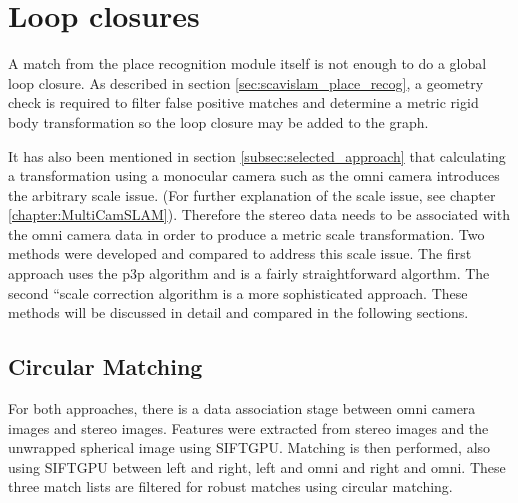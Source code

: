 \section{Loop closures}
\label{sec:calc_loop_edge}

A match from the place recognition module itself is not enough to do a global loop closure.  As described in section \ref{sec:scavislam_place_recog}, a geometry check is required to filter false positive matches and determine a metric rigid body transformation so the loop closure may be added to the graph.

It has also been mentioned in section \ref{subsec:selected_approach} that calculating a transformation using a monocular camera such as the omni camera introduces the arbitrary scale issue.  (For further explanation of the scale issue, see chapter \ref{chapter:MultiCamSLAM}). Therefore the stereo data needs to be associated with the omni camera data in order to produce a metric scale transformation.  Two methods were developed and compared to address this scale issue.  The first approach uses the p3p algorithm and is a fairly straightforward algorthm.  The second ``scale correction algorithm is a more sophisticated approach.  These methods will be discussed in detail and compared in the following sections. 

\subsection{Circular Matching}


For both approaches, there is a data association stage between omni camera images and stereo images.  Features were extracted from stereo images and the unwrapped spherical image using SIFTGPU\cite{siftgpu_11}.  Matching is then performed, also using SIFTGPU between left and right, left and omni and right and omni.  These three match lists are filtered for robust matches using circular matching. 


